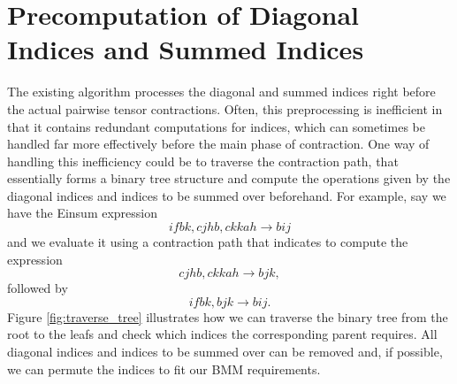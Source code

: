 \section{Precomputation of Diagonal Indices and Summed Indices}
The existing algorithm processes the diagonal and summed indices right before the actual pairwise 
tensor contractions. Often, this preprocessing is inefficient in
that it contains redundant computations for indices, which can sometimes be handled far more
effectively before the main phase of contraction. One way of handling this inefficiency could
be to traverse the contraction path, that essentially forms a binary tree structure and compute
the operations given by the diagonal indices and indices to be summed over beforehand. For example,
say we have the Einsum expression
\begin{equation*}
    ifbk, cjhb, ckkah \rightarrow bij
\end{equation*}
and we evaluate it using a contraction path that indicates to compute the expression
\begin{equation*}
    cjhb, ckkah \rightarrow bjk,
\end{equation*}
followed by
\begin{equation*}
    ifbk, bjk \rightarrow bij.
\end{equation*}
Figure \ref{fig:traverse_tree} illustrates how we can traverse the binary tree from the root to the leafs and
check which indices the corresponding parent requires. All diagonal indices and indices to be
summed over can be removed and, if possible, we can permute the indices to fit our BMM requirements.
\\
\\


